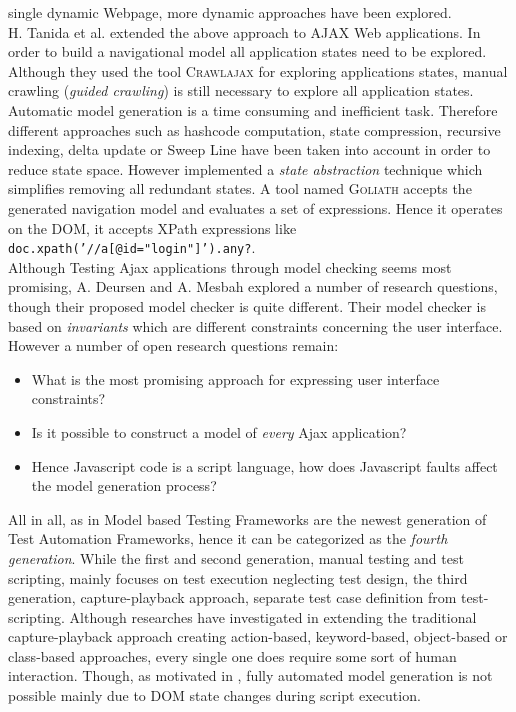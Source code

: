 \documentclass[12pt, notitlepage]{article}
\begin{document}
single dynamic Webpage, more dynamic approaches have been explored.\\
H. Tanida et al.\cite{dynamic-testing-web-applications} extended the above approach to AJAX Web applications. In order to build a navigational model all 
application states need to be explored. Although they used the tool \textsc{Crawlajax}\cite{crawlajax} for exploring applications states, manual
crawling (\textit{guided crawling}) is still necessary to explore all application states. Automatic model generation is a time consuming and inefficient task. 
Therefore different approaches such as hashcode computation, state compression, recursive indexing\cite{recursive-indexing}, delta update or Sweep
Line\cite{sweep-line} have been taken into account in order to reduce state space\cite{state-space-reduction}. However \cite{dynamic-testing-web-applications}
implemented a \textit{state abstraction} technique which simplifies removing all redundant states. A tool
named \textsc{Goliath} accepts the generated navigation model and evaluates a set of expressions. Hence it operates on the DOM, it accepts XPath expressions like \texttt{doc.xpath('//a[@id="login"]').any?}. \\
Although Testing Ajax applications through model checking seems most promising, A. Deursen and A. Mesbah\cite{research-issues-model-checking-ajax} explored
a number of research questions, though their proposed model checker is quite different. Their model checker\cite{atusa} is based on \textit{invariants} which are
different constraints concerning the user interface. However a number of open research questions remain:
\begin{itemize}
	\item What is the most promising approach for expressing user interface constraints?
	\item Is it possible to construct a model of \textit{every} Ajax application?
	\item Hence Javascript code is a script language, how does Javascript faults affect the model generation process?
\end{itemize}
\vspace{1.5cm}
All in all, as in \cite{why-model-based-automation} Model based Testing Frameworks are the newest generation of Test
Automation Frameworks, hence it can be categorized as the \textit{fourth generation}. While the first and second generation, manual
testing and test scripting, mainly focuses on test execution neglecting test design, the third generation, capture-playback approach, separate test case definition from test-scripting. Although researches have investigated in extending the traditional capture-playback approach creating action-based, keyword-based, object-based or class-based approaches, every single one does require
some sort of human interaction. Though, as motivated in \cite{crawlajax}, fully automated model generation is not possible mainly
due to DOM state changes during script execution. 
 
\end{document}
